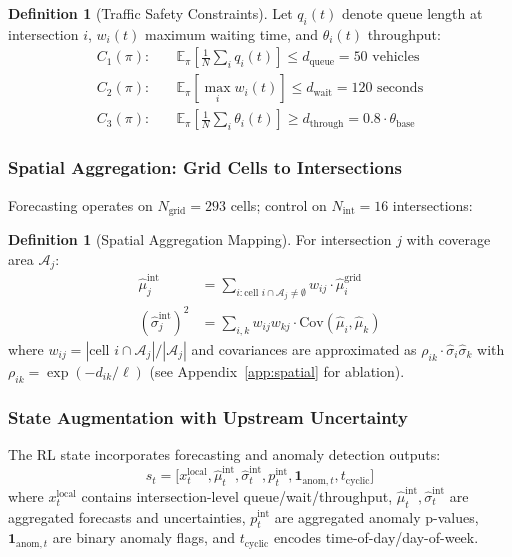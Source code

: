 \documentclass{article}
\theoremstyle{plain}
\theoremstyle{definition}
\newtheorem{definition}[theorem]{Definition}
\theoremstyle{remark}
\begin{document}
\begin{definition}[Traffic Safety Constraints]
\label{def:constraints}
Let $q_i(t)$ denote queue length at intersection $i$, $w_i(t)$ maximum waiting time, and $\theta_i(t)$ throughput:
\begin{align}
C_1(\pi): & \quad \mathbb{E}_\pi\left[\frac{1}{N}\sum_i q_i(t)\right] \leq d_{\text{queue}} = 50 \text{ vehicles} \label{eq:c1}\\
C_2(\pi): & \quad \mathbb{E}_\pi\left[\max_i w_i(t)\right] \leq d_{\text{wait}} = 120 \text{ seconds} \label{eq:c2}\\
C_3(\pi): & \quad \mathbb{E}_\pi\left[\frac{1}{N}\sum_i \theta_i(t)\right] \geq d_{\text{through}} = 0.8 \cdot \theta_{\text{base}} \label{eq:c3}
\end{align}
\end{definition}

\subsubsection{Spatial Aggregation: Grid Cells to Intersections}

Forecasting operates on $N_{\text{grid}} = 293$ cells; control on $N_{\text{int}} = 16$ intersections:

\begin{definition}[Spatial Aggregation Mapping]
\label{def:spatial_agg}
For intersection $j$ with coverage area $\mathcal{A}_j$:
\begin{align}
\hat{\mu}_j^{\text{int}} &= \sum_{i: \text{cell } i \cap \mathcal{A}_j \neq \emptyset} w_{ij} \cdot \hat{\mu}_i^{\text{grid}} \label{eq:mu_agg}\\
(\hat{\sigma}_j^{\text{int}})^2 &= \sum_{i,k} w_{ij} w_{kj} \cdot \text{Cov}(\hat{\mu}_i, \hat{\mu}_k) \label{eq:sigma_agg}
\end{align}
where $w_{ij} = |\text{cell } i \cap \mathcal{A}_j| / |\mathcal{A}_j|$ and covariances are approximated as $\rho_{ik} \cdot \hat{\sigma}_i \hat{\sigma}_k$ with $\rho_{ik} = \exp(-d_{ik}/\ell)$ (see Appendix~\ref{app:spatial} for ablation).
\end{definition}

\subsubsection{State Augmentation with Upstream Uncertainty}

The RL state incorporates forecasting and anomaly detection outputs:
\begin{equation}
s_t = \big[x_t^{\text{local}}, \hat{\mu}_t^{\text{int}}, \hat{\sigma}_t^{\text{int}}, p_t^{\text{int}}, \mathbf{1}_{\text{anom},t}, t_{\text{cyclic}}\big]
\label{eq:rl_state}
\end{equation}
where $x_t^{\text{local}}$ contains intersection-level queue/wait/throughput, $\hat{\mu}_t^{\text{int}}, \hat{\sigma}_t^{\text{int}}$ are aggregated forecasts and uncertainties, $p_t^{\text{int}}$ are aggregated anomaly p-values, $\mathbf{1}_{\text{anom},t}$ are binary anomaly flags, and $t_{\text{cyclic}}$ encodes time-of-day/day-of-week.
\end{document}
